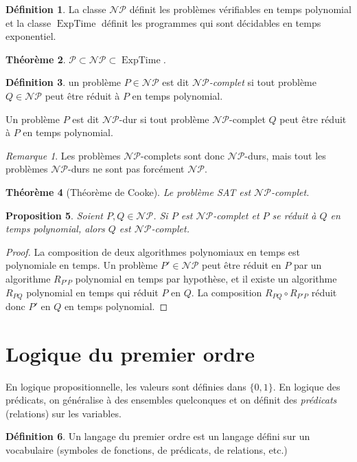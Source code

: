 \documentclass{article}
\newtheorem{thm}{Théorème}[section]
\newtheorem{prp}[thm]{Proposition}
\theoremstyle{definition}
\newtheorem{déf}[thm]{Définition}
\theoremstyle{remark}
\newtheorem*{rmq}{Remarque}
\newcommand{\NP}{\mathcal {NP}}
\DeclareMathOperator{\ExpTime}{ExpTime}
\begin{document}
	\begin{déf} La classe $\NP$ définit les problèmes vérifiables en temps polynomial et la classe $\ExpTime$ définit les programmes qui sont décidables
	en temps exponentiel.
	\end{déf}

	\begin{thm} $\mathcal P \subset \NP \subset \ExpTime$.
	\end{thm}

	\begin{déf} un problème $P \in \NP$ est dit \textit{$\NP$-complet} si tout problème $Q \in \NP$ peut être réduit à $P$ en temps polynomial.

	Un problème $P$ est dit $\NP$-dur si tout problème $\NP$-complet $Q$ peut être réduit à $P$ en temps polynomial.
	\end{déf}

	\begin{rmq} Les problèmes $\NP$-complets sont donc $\NP$-durs, mais tout les problèmes $\NP$-durs ne sont pas forcément $\NP$.
	\end{rmq}

	\begin{thm}[Théorème de Cooke] Le problème SAT est $\NP$-complet.
	\end{thm}

	\begin{prp} Soient $P, Q \in \NP$. Si $P$ est $\NP$-complet et $P$ se réduit à $Q$ en temps polynomial, alors $Q$ est $\NP$-complet.
	\end{prp}

	\begin{proof} La composition de deux algorithmes polynomiaux en temps est polynomiale en temps. Un problème $P' \in \NP$ peut être
	réduit en $P$ par un algorithme $R_{P'P}$ polynomial en temps par hypothèse, et il existe un algorithme $R_{PQ}$ polynomial en temps
	qui réduit $P$ en $Q$. La composition $R_{PQ} \circ R_{P'P}$ réduit donc $P'$ en $Q$ en temps polynomial.
	\end{proof}

\section{Logique du premier ordre}
	En logique propositionnelle, les valeurs sont définies dans $\{0, 1\}$. En logique des prédicats, on généralise à des ensembles quelconques et on définit
	des \textit{prédicats} (relations) sur les variables.

	\begin{déf} Un langage du premier ordre est un langage défini sur un vocabulaire (symboles de fonctions, de prédicats, de relations, etc.)
	\end{déf}
\end{document}
